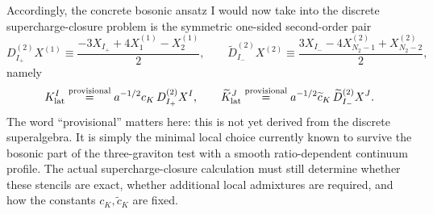 \documentclass[11pt]{article}
\numberwithin{equation}{section}
\begin{document}
Accordingly, the concrete bosonic ansatz I would now take into the discrete supercharge-closure problem is the symmetric one-sided second-order pair
\begin{equation}
\label{eq:s15-1-035}
D^{(2)}_{I_+}X^{(1)}
\equiv
\frac{-3X_{I_+}+4X_1^{(1)}-X_2^{(1)}}{2},
\qquad
\widetilde D^{(2)}_{I_-}X^{(2)}
\equiv
\frac{3X_{I_-}-4X_{N_2-1}^{(2)}+X_{N_2-2}^{(2)}}{2},
\end{equation}
namely
\begin{equation}
\label{eq:s15-1-036}
K_{\mathrm{lat}}^I
\stackrel{\rm provisional}{=}
a^{-1/2}c_K\,D^{(2)}_{I_+}X^I,
\qquad
\widetilde K_{\mathrm{lat}}^J
\stackrel{\rm provisional}{=}
a^{-1/2}\widetilde c_K\,\widetilde D^{(2)}_{I_-}X^J.
\end{equation}
The word ``provisional'' matters here: this is not yet derived from the discrete superalgebra. It is simply the minimal local choice currently known to survive the bosonic part of the three-graviton test with a smooth ratio-dependent continuum profile. The actual supercharge-closure calculation must still determine whether these stencils are exact, whether additional local admixtures are required, and how the constants $c_K,\widetilde c_K$ are fixed.
\end{document}
